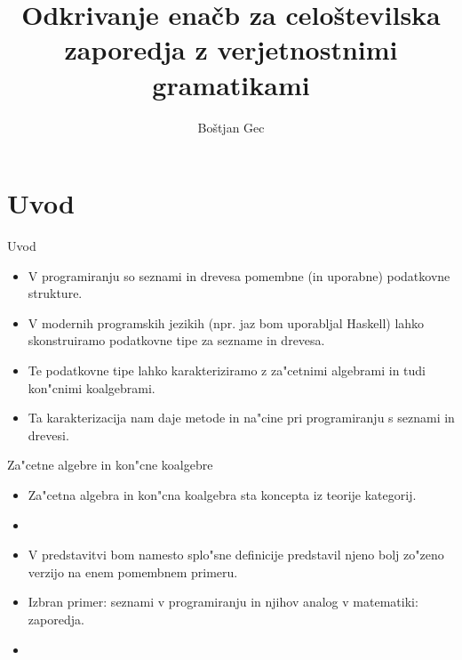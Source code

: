 \documentclass[t,usenames,dvipsnames]{beamer} %
\title{Odkrivanje enačb za celoštevilska zaporedja z verjetnostnimi gramatikami}
\author{Boštjan Gec}
\institute{mentor: prof. dr. Ljupčo Todorovski}
\begin{document}
\begin{frame}
  \maketitle
\end{frame}


\section{Uvod}

\begin{frame}{Uvod}
	\begin{itemize}
		\item V programiranju so seznami in drevesa pomembne (in uporabne) podatkovne strukture.
		
		\item V modernih programskih jezikih (npr. jaz bom uporabljal Haskell) lahko skonstruiramo podatkovne tipe za sezname in drevesa.
		
		\item Te podatkovne tipe lahko karakteriziramo z za"cetnimi algebrami in tudi kon"cnimi koalgebrami.
		
		\item Ta karakterizacija nam daje metode in na"cine pri programiranju s seznami in drevesi.
	\end{itemize}
\end{frame}
\begin{frame}{Za"cetne algebre in kon"cne koalgebre}
	\begin{itemize}
		\item 	Za"cetna algebra in kon"cna koalgebra sta koncepta iz teorije kategorij.
		
		\item 
		
		\item V predstavitvi bom namesto splo"sne definicije predstavil njeno bolj zo"zeno verzijo na enem pomembnem primeru.
		
		\item Izbran primer: seznami v programiranju in njihov analog v matematiki: zaporedja.
		
		\item 
	\end{itemize}
\end{frame}
\end{document}
